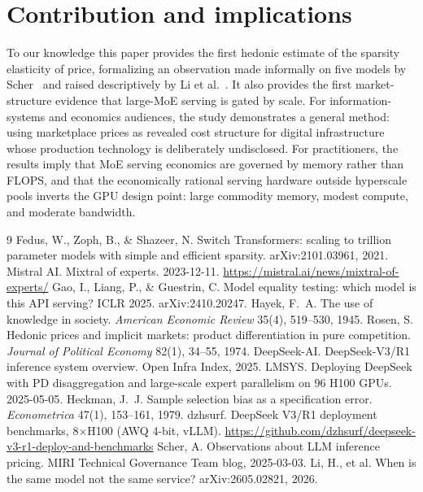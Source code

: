 \documentclass[12pt]{article}
\begin{document}
\section{Contribution and implications}

To our knowledge this paper provides the first hedonic estimate of the sparsity elasticity of price, formalizing an observation made informally on five models by Scher~\cite{scher} and raised descriptively by Li et al.~\cite{li}. It also provides the first market-structure evidence that large-MoE serving is gated by scale. For information-systems and economics audiences, the study
demonstrates a general method: using marketplace prices as revealed cost
structure for digital infrastructure whose production technology is
deliberately undisclosed. For practitioners, the results imply that MoE
serving economics are governed by memory rather than FLOPS, and that the
economically rational serving hardware outside hyperscale pools inverts the
GPU design point: large commodity memory, modest compute, and moderate
bandwidth.

\begin{thebibliography}{9}
 Fedus, W., Zoph, B., \& Shazeer, N. Switch Transformers:
scaling to trillion parameter models with simple and efficient sparsity.
arXiv:2101.03961, 2021.
 Mistral AI. Mixtral of experts. 2023-12-11.
\url{https://mistral.ai/news/mixtral-of-experts/}
 Gao, I., Liang, P., \& Guestrin, C. Model equality testing:
which model is this API serving? ICLR 2025. arXiv:2410.20247.
 Hayek, F.~A. The use of knowledge in society. \emph{American
Economic Review} 35(4), 519--530, 1945.
 Rosen, S. Hedonic prices and implicit markets: product
differentiation in pure competition. \emph{Journal of Political Economy}
82(1), 34--55, 1974.
 DeepSeek-AI. DeepSeek-V3/R1 inference system overview.
Open Infra Index, 2025.
 LMSYS. Deploying DeepSeek with PD disaggregation and
large-scale expert parallelism on 96 H100 GPUs. 2025-05-05.
 Heckman, J.~J. Sample selection bias as a specification
error. \emph{Econometrica} 47(1), 153--161, 1979.
 dzhsurf. DeepSeek V3/R1 deployment benchmarks, 8$\times$H100
(AWQ 4-bit, vLLM). \url{https://github.com/dzhsurf/deepseek-v3-r1-deploy-and-benchmarks}
 Scher, A. Observations about LLM inference pricing. MIRI
Technical Governance Team blog, 2025-03-03.
 Li, H., et al. When is the same model not the same service?
arXiv:2605.02821, 2026.
\end{thebibliography}
\end{document}
